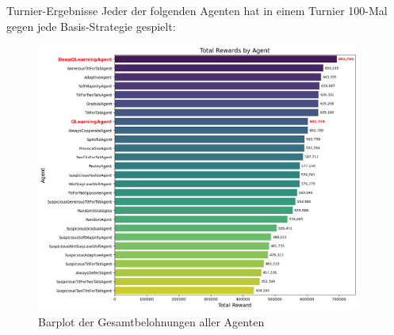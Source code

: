 \documentclass[final]{beamer}
\newlength{\sepwidth}
\newlength{\colwidth}
\newcommand{\separatorcolumn}{\begin{column}{\sepwidth}\end{column}}
\begin{document}
\begin{frame}[t]
\begin{columns}[t]
\begin{column}{\colwidth}
  \begin{alertblock}{Turnier-Ergebnisse}
    Jeder der folgenden Agenten hat in einem Turnier 100-Mal gegen jede Basis-Strategie gespielt:
     \begin{figure}[h]
      \centering
      \includegraphics[width=20cm]{logos/tournament.png}
      \caption{Barplot der Gesamtbelohnungen aller Agenten}
    \end{figure}
  
  \end{alertblock}

\end{column}

\separatorcolumn
\end{columns}
\end{frame}
\end{document}
